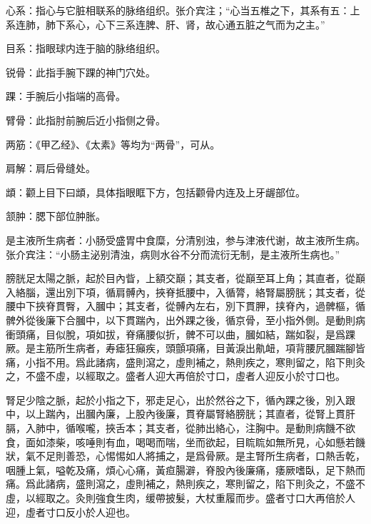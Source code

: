 \documentclass[12pt]{ctexbook}%
\begin{document}

\begin{jiaozhu}
	\item 心系：指心与它脏相联系的脉络组织。张介宾注；“心当五椎之下，其系有五：上系连肺，肺下系心，心下三系连脾、肝、肾，故心通五脏之气而为之主。”
	\item 目系：指眼球内连于脑的脉络组织。
	\item 锐骨：此指手腕下踝的神门穴处。
	\item 踝：手腕后小指端的高骨。
	\item 臂骨：此指肘前腕后近小指侧之骨。
	\item 两筋：《甲乙经》、《太素》等均为“两骨”，可从。
	\item 肩解：肩后骨缝处。
	\item 䪼：颧上目下曰䪼，具体指眼眶下方，包括颧骨内连及上牙龌部位。
	\item 颔肿：腮下部位肿胀。
	\item 是主液所生病者：小肠受盛胃中食糜，分清别浊，参与津液代谢，故主液所生病。张介宾注：“小肠主泌别清浊，病则水谷不分而流衍无制，是主液所生病也。”
\end{jiaozhu}


\begin{yuanwen}
膀胱足太陽之脈，起於目內眥，上額交巔；其支者，從巔至耳上角；其直者，從巔入絡腦，還出別下項，循肩髆內，挾脊抵腰中，入循膂，絡腎屬膀胱；其支者，從腰中下挾脊貫臀，入膕中；其支者，從髆內左右，別下貫胛，挟脊內，過髀樞，循髀外從後廉下合膕中，以下貫踹內，出外踝之後，循京骨，至小指外側。是動則病衝頭痛，目似脫，項如拔，脊痛腰似折，髀不可以曲，膕如結，踹如裂，是爲踝厥。是主筋所生病者，寿瘧狂癲疾，頭顫項痛，目黃淚出鼽衄，項背腰凥膕踹腳皆痛，小指不用。爲此諸病，盛則瀉之，虛則補之，熱則疾之，寒則留之，陷下則灸之，不盛不虛，以經取之。盛者人迎大再倍於寸口，虛者人迎反小於寸口也。

腎足少陰之脈，起於小指之下，邪走足心，出於然谷之下，循內踝之後，別入跟中，以上踹內，出膕內廉，上股內後廉，貫脊屬腎絡膀胱；其直者，從腎上貫肝膈，入肺中，循喉嚨，挾舌本；其支者，從肺出絡心，注胸中。是動則病饑不欲食，面如漆柴，咳唾則有血，喝喝而喘，坐而欲起，目䀮䀮如無所見，心如懸若饑狀，氣不足則善恐，心惕惕如人將捕之，是爲骨厥。是主腎所生病者，口熱舌乾，咽腫上氣，嗌乾及痛，煩心心痛，黃疸腸澼，脊股內後廉痛，痿厥嗜臥，足下熱而痛。爲此諸病，盛則瀉之，虛則補之，熱則疾之，寒則留之，陷下則灸之，不盛不虛，以經取之。灸則強食生肉，缓帶披髮，大杖重履而步。盛者寸口大再倍於人迎，虛者寸口反小於人迎也。
\end{yuanwen}
\end{document}
